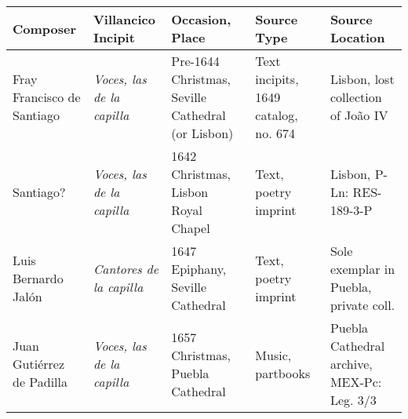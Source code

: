 \documentclass{aac-table}
\begin{document}
\small
\renewcommand{\arraystretch}{1.5}
\begin{tabulary}{\textwidth}{LLLLL}
    \toprule
    Composer & Villancico Incipit & Occasion, Place & Source Type & Source
    Location \\ \midrule
    
    Fray Francisco de Santiago & 
    \emph{Voces, las de la capilla} &
    Pre-1644 Christmas, Seville Cathedral (or Lisbon) &
    Text incipits, 1649 catalog, no. 674 &
    Lisbon, lost collection of João IV \\

    Santiago? & 
    \emph{Voces, las de la capilla} & 
    1642 Christmas, Lisbon Royal Chapel &
    Text, poetry imprint &
    Lisbon, P-Ln: RES-189-3-P \\

    Luis Bernardo Jalón & 
    \emph{Cantores de la capilla} & 
    1647 Epiphany, Seville Cathedral & 
    Text, poetry imprint & 
    Sole exemplar in Puebla, private coll. \\

    Juan Gutiérrez de Padilla & 
    \emph{Voces, las de la capilla} & 
    1657 Christmas, Puebla Cathedral & 
    Music, partbooks & 
    Puebla Cathedral archive, MEX-Pc: Leg. 3/3 \\
    \bottomrule
\end{tabulary}
\end{document}
